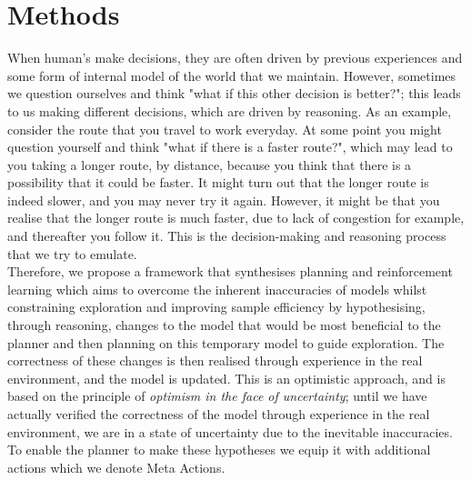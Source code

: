 \chapter{Methods}
\label{chapter4}

When human's make decisions, they are often driven by previous experiences and some form of internal model of the world that we maintain. However, sometimes we question ourselves and think "what if this other decision is better?"; this leads to us making different decisions, which are driven by reasoning. As an example, consider the route that you travel to work everyday. At some point you might question yourself and think "what if there is a faster route?", which may lead to you taking a longer route, by distance, because you think that there is a possibility that it could be faster. It might turn out that the longer route is indeed slower, and you may never try it again. However, it might be that you realise that the longer route is much faster, due to lack of congestion for example, and thereafter you follow it. This is the decision-making and reasoning process that we try to emulate.
\\Therefore, we propose a framework that synthesises planning and reinforcement learning which aims to overcome the inherent inaccuracies of models whilst constraining exploration  and improving sample efficiency by hypothesising, through reasoning, changes to the model that would be most beneficial to the planner and then planning on this temporary model to guide exploration. The correctness of these changes is then realised through experience in the real environment, and the model is updated.
This is an optimistic approach, and is based on the principle of \textit{optimism in the face of uncertainty}; until we have actually verified the correctness of the model through experience in the real environment, we are in a state of uncertainty due to the inevitable inaccuracies.
To enable the planner to make these hypotheses we equip it with additional actions which we denote Meta Actions.
